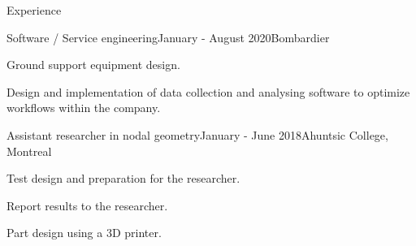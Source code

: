 \documentclass[french,12pt]{resume} %
\begin{document}
	
	
	\begin{rSection}{Experience}
		
		\begin{rSubsection}{Software / Service engineering}{January - August 2020}{Bombardier}{}{}
			\item Ground support equipment design.
			\item Design and implementation of data collection and analysing software to optimize workflows within the company.
		\end{rSubsection}
		
		\begin{rSubsection}{Assistant researcher in nodal geometry}{January - June 2018}{Ahuntsic College, Montreal}{}
			\item   Test design and preparation for the researcher.
			\item   Report results to the researcher.
			\item   Part design using a 3D printer.
		\end{rSubsection}
		
		
	\end{rSection}
	
	
	\iffalse
	\begin{rSection}{Accomplissements académiques} 
		\begin{rSubsection}{Collège Ahuntsic, Montréal}{2018}{Bourse d'implication scientifique}
			 
		\end{rSubsection}
		\begin{rSubsection}{Polytechnique Montréal}{2018}{Bourse d'excellence à l'admission}
			  
		\end{rSubsection}
		
	\end{rSection}
	\fi
	
\end{document}
